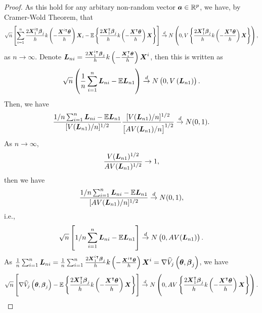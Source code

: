 \begin{proof}
	As this hold for any arbitary non-random vector $\boldsymbol{a}\in \mathbb{R}^p$, we have, by Cramer-Wold Theorem, that
	\begin{gather*}
	\sqrt{n}\left[\sum_{i=1}^{n}\frac{2\boldsymbol{X}_{1}^{i\intercal}\boldsymbol{\beta}_j}{h}k\left(-\frac{\boldsymbol{X}^{i\intercal}\boldsymbol{\theta}}{h}\right)\boldsymbol{X}_{i}-\mathbb{E}\left\{\frac{2\boldsymbol{X}_{1}^{\intercal}\boldsymbol{\beta}_j}{h}k\left(-\frac{\boldsymbol{X}^{\intercal}\boldsymbol{\theta}}{h}\right)\boldsymbol{X}\right\}\right]\overset{d}{\to}N\left(0,V\left\{\frac{2\boldsymbol{X}_{1}^{\intercal}\boldsymbol{\beta}_j}{h}k\left(-\frac{\boldsymbol{X}^{\intercal}\boldsymbol{\theta}}{h}\right)\boldsymbol{X}\right\}\right),
	\end{gather*}
	as $n \to \infty$. Denote $\boldsymbol{L}_{ni}=\frac{2\boldsymbol{X}_{1}^{i\intercal}\boldsymbol{\beta}_j}{h}k\left(-\frac{\boldsymbol{X}_{i}^{\intercal}\boldsymbol{\theta}}{h}\right)\boldsymbol{X}^{i}$,
	then this is written as
	\begin{gather*}
	\sqrt{n}\left(\frac{1}{n}\sum_{i=1}^{n}\boldsymbol{L}_{ni}-\mathbb{E}\boldsymbol{L}_{n1}\right)\overset{d}{\to}N\left(0,V\left(\boldsymbol{L}_{n1}\right)\right).
	\end{gather*}
	Then, we have
	\begin{gather*}
	\frac{1/n\sum_{i=1}^{n}\boldsymbol{L}_{ni}-\mathbb{E}\boldsymbol{L}_{n1}}{[V(\boldsymbol{L}_{n1})/n]^{1/2}}\frac{[V(\boldsymbol{L}_{n1})/n]^{1/2}}{\left[AV(\boldsymbol{L}_{n1})/n\right]^{1/2}}\overset{d}{\to}N(0,1).
	\end{gather*}
	As  $n \to \infty$, 
	\begin{gather*}
	\frac{V(\boldsymbol{L}_{n1})^{1/2}}{AV(\boldsymbol{L}_{n1})^{1/2}}\to1,
	\end{gather*}
	then we have
	\begin{gather*}
	\frac{1/n\sum_{i=1}^{n}\boldsymbol{L}_{ni}-\mathbb{E}\boldsymbol{L}_{n1}}{[AV(\boldsymbol{L}_{n1})/n]^{1/2}}\overset{d}{\to}N(0,1),
	\end{gather*}
	i.e.,
	\begin{gather*}
	\sqrt{n}\left[1/n\sum_{i=1}^{n}\boldsymbol{L}_{ni}-\mathbb{E}\boldsymbol{L}_{n1}\right]\overset{d}{\to}N\left(0,AV(\boldsymbol{L}_{n1})\right).
	\end{gather*}
	As $\frac{1}{n}\sum_{i=1}^{n}\boldsymbol{L}_{ni} = \frac{1}{n}\sum_{i=1}^n\frac{2\boldsymbol{X}_{1}^{i\intercal}\boldsymbol{\beta}_j}{h}k\left(-\frac{\boldsymbol{X}^{i\intercal}\boldsymbol{\theta}}{h}\right)\boldsymbol{X}^{i} =\nabla\widehat{V}_j\left(\boldsymbol{\theta}, \boldsymbol{\beta}_j\right)$, we have
	\begin{gather}
	\begin{flalign*}
	\sqrt{n}\left[\nabla\widehat{V}_j\left(\boldsymbol{\theta}, \boldsymbol{\beta}_j\right) -\mathbb{E}\left\{\frac{2\boldsymbol{X}_{1}^{\intercal}\boldsymbol{\beta}_j}{h}k\left(-\frac{\boldsymbol{X}^{\intercal}\boldsymbol{\theta}}{h}\right)\boldsymbol{X}\right\}\right]\overset{d}{\to}N\left(0,AV\left\{\frac{2\boldsymbol{X}_1^{\intercal}\boldsymbol{\beta}_j}{h}k\left(-\frac{\boldsymbol{X}^{\intercal}\boldsymbol{\theta}}{h}\right)\boldsymbol{X}\right\}\right).
	\end{flalign*}
	\end{gather}
\end{proof}
